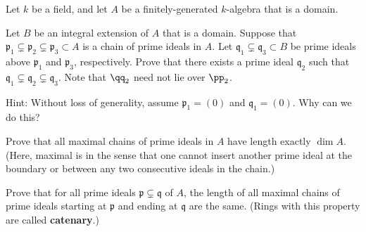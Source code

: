 \begin{problem}
Let $k$ be a field, and let $A$ be a finitely-generated $k$-algebra that is a domain.
\begin{alphenum}
\item Let $B$ be an integral extension of $A$ that is a domain. Suppose that $\mathfrak p_1 \subsetneq  \mathfrak p_2 \subsetneq \mathfrak p_3 \subset A$ is a chain of prime ideals in $A$. Let $\mathfrak q_1\subsetneq\mathfrak q_3\subset B$ be prime ideals above $\mathfrak p_1$ and $\mathfrak p_3$, respectively. Prove that there exists a prime ideal $\mathfrak q_2$ such that $\mathfrak q_1\subsetneq \mathfrak q_2\subsetneq \mathfrak q_3$.
Note that $\qq_2$ need not lie over $\pp_2$.

Hint: Without loss of generality, 
assume $\mathfrak p_1 = (0)$ and $\mathfrak q_1=(0)$. 
Why can we do this?
\item Prove that all maximal chains of prime ideals in $A$ have length exactly $\dim A$. 
(Here, maximal is in the sense that one cannot insert another prime ideal at the boundary or 
between any two consecutive ideals in the chain.)
\item Prove that for all prime ideals $\mathfrak p \subsetneq \mathfrak q$ of $A$, the length of all maximal chains of prime ideals starting at $\mathfrak p$ and ending at $\mathfrak q$ are the same. (Rings with this property are called \textbf{catenary}.)
\end{alphenum}
\end{problem}
